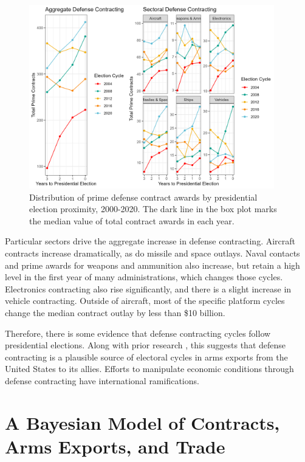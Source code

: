 \documentclass[12pt]{article}
\begin{document}
\begin{figure}[htpb]
	\centering
		\includegraphics[width=0.95\textwidth]{../figures/contract-cycles.png}
	\caption{Distribution of prime defense contract awards by presidential election proximity, 2000-2020. The dark line in the box plot marks the median value of total contract awards in each year.}
	\label{fig:contract-cycles}
\end{figure}


Particular sectors drive the aggregate increase in defense contracting. 
Aircraft contracts increase dramatically, as do missile and space outlays. 
Naval contacts and prime awards for weapons and ammunition also increase, but retain a high level in the first year of many administrations, which changes those cycles. 
Electronics contracting also rise significantly, and there is a slight increase in vehicle contracting. 
Outside of aircraft, most of the specific platform cycles change the median contract outlay by less than \$10 billion.


Therefore, there is some evidence that defense contracting cycles follow presidential elections.
Along with prior research \citep{DerouenHeo2000}, this suggests that defense contracting is a plausible source of electoral cycles in arms exports from the United States to its allies.
Efforts to manipulate economic conditions through defense contracting have international ramifications. 




\section{A Bayesian Model of Contracts, Arms Exports, and Trade}
\end{document}
